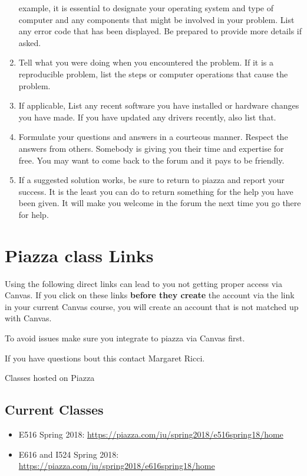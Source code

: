 \begin{enumerate}
  example, it is essential to designate your operating system and type
  of computer and any components that might be involved in your problem.
  List any error code that has been displayed. Be prepared to provide
  more details if asked.
\item
  Tell what you were doing when you encountered the problem. If it is a
  reproducible problem, list the steps or computer operations that cause
  the problem.
\item
  If applicable, List any recent software you have installed or hardware
  changes you have made. If you have updated any drivers recently, also
  list that.
\item
  Formulate your questions and answers in a courteous manner. Respect
  the answers from others. Somebody is giving you their time and
  expertise for free. You may want to come back to the forum and it pays
  to be friendly.
\item
  If a suggested solution works, be sure to return to piazza and report
  your success. It is the least you can do to return something for the
  help you have been given. It will make you welcome in the forum the
  next time you go there for help.
\end{enumerate}

\section{Piazza class Links}\label{piazza-class-links}

Using the following direct links can lead to you not
getting proper access via Canvas. If you click on these links
\textbf{before they create} the account via the link in your current
Canvas course, you will create an account that is not matched up with
Canvas.

To avoid issues make sure you integrate to piazza via Canvas first.

If you have questions bout this contact Margaret Ricci.

Classes hosted on Piazza

\subsection{Current Classes}

\begin{itemize}
\item  E516 Spring 2018:          \url{https://piazza.com/iu/spring2018/e516spring18/home}
\item  E616 and I524 Spring 2018: \url{https://piazza.com/iu/spring2018/e616spring18/home}
\end{itemize}


